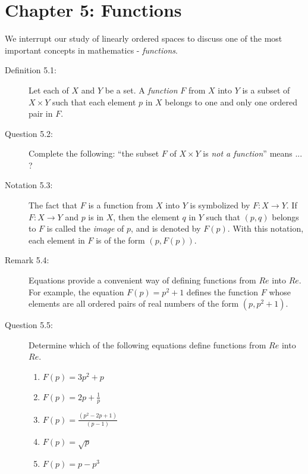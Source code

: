 \documentclass{book}
\begin{document}
\chapter*{Chapter 5: Functions}


We interrupt our study of linearly ordered spaces to discuss one of the most important concepts in mathematics - \emph{functions}.

\begin{description}

\item[Definition 5.1:] Let each of $X$ and $Y$ be a set. A \emph{function} $F$ from $X$ into $Y$ is a subset of $X \times Y$ such that each element $p$ in $X$ belongs to one and only one ordered pair in $F$.

\item[Question 5.2:] Complete the following: ``the subset $F$ of $X \times Y$ is \emph{not a function}'' means ... ?

\item[Notation 5.3:] The fact that $F$ is a function from $X$ into $Y$ is symbolized by $F: X \rightarrow Y$. If $F: X \rightarrow Y$ and $p$ is in $X$, then the element $q$ in $Y$ such that $(p,q)$ belongs to $F$ is called the \emph{image} of $p$, and is denoted by $F(p)$. With this notation, each element in $F$ is of the form $(p,F(p))$.

\item[Remark 5.4:] Equations provide a convenient way of defining functions from $Re$ into $Re$. For example, the equation $F(p) = p^{2} + 1$ defines the function $F$ whose elements are all ordered pairs of real numbers of the form $(p, p^{2}+1)$.

\item[Question 5.5:] Determine which of the following equations define functions from $Re$ into $Re$.
\begin{enumerate}[\hspace{1cm}(a)]
  \item $F(p) = 3p^{2} + p$
  \item $F(p) = 2p + \frac{1}{p}$
  \item $F(p) = \frac{(p^{2} - 2p + 1)}{(p - 1)}$
  \item $F(p) = \sqrt{p}$
  \item $F(p) = p - p^{3}$
\end{enumerate}


\end{description}
\end{document}
